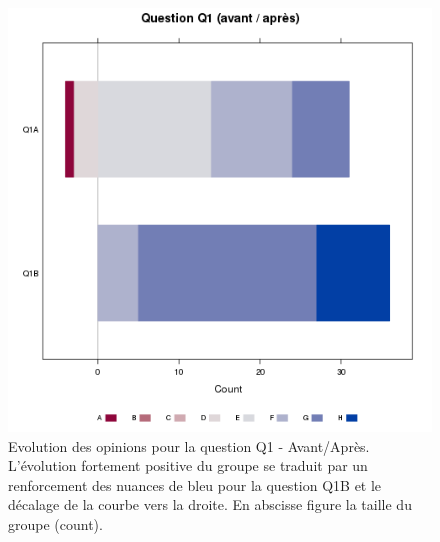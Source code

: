 \documentclass[12pt,english,french]{article}\usepackage{graphicx, color}
\makeatletter
\def\maxwidth{ %
  \ifdim\Gin@nat@width>\linewidth
    \linewidth
  \else
    \Gin@nat@width
  \fi
}
\newenvironment{knitrout}{}{} %
\makeatother
\begin{document}
\begin{figure}
\begin{center}
\begin{knitrout}
\color{fgcolor}
\includegraphics[width=\maxwidth]{../figure/unnamed-chunk-10.png} 

\end{knitrout}

\end{center}
\caption{Evolution des opinions pour la question Q1 - Avant/Après. L'évolution fortement positive du groupe se traduit par un renforcement des nuances de bleu pour la question Q1B et le décalage de la courbe vers la droite. En abscisse figure la taille du groupe (count).}
\label{Q1_likert}
\end{figure}

 

\end{document}
